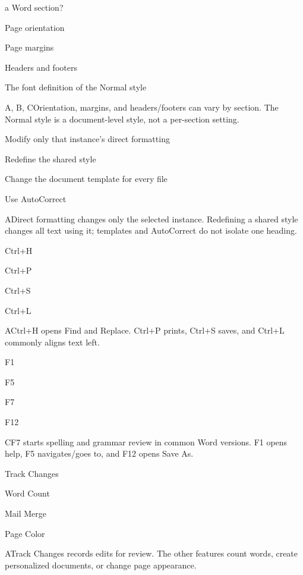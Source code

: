 \begin{enumerate}[label=\textbf{Q\arabic*.}, leftmargin=*]
{  a Word section?}
  {\item Page orientation
   \item Page margins
   \item Headers and footers
   \item The font definition of the Normal style}
  {A, B, C}{Orientation, margins, and headers/footers can vary by section. The
  Normal style is a document-level style, not a per-section setting.}
\fi
\ifnum{}
  {\item Modify only that instance's direct formatting
   \item Redefine the shared style
   \item Change the document template for every file
   \item Use AutoCorrect}
  {A}{Direct formatting changes only the selected instance. Redefining a shared style changes all text using it; templates and AutoCorrect do not isolate one heading.}
  {\item Ctrl+H
   \item Ctrl+P
   \item Ctrl+S
   \item Ctrl+L}
  {A}{Ctrl+H opens Find and Replace. Ctrl+P prints, Ctrl+S saves, and Ctrl+L commonly aligns text left.}
  {\item F1
   \item F5
   \item F7
   \item F12}
  {C}{F7 starts spelling and grammar review in common Word versions. F1 opens help, F5 navigates/goes to, and F12 opens Save As.}
  {\item Track Changes
   \item Word Count
   \item Mail Merge
   \item Page Color}
  {A}{Track Changes records edits for review. The other features count words, create personalized documents, or change page appearance.}

\end{enumerate}
